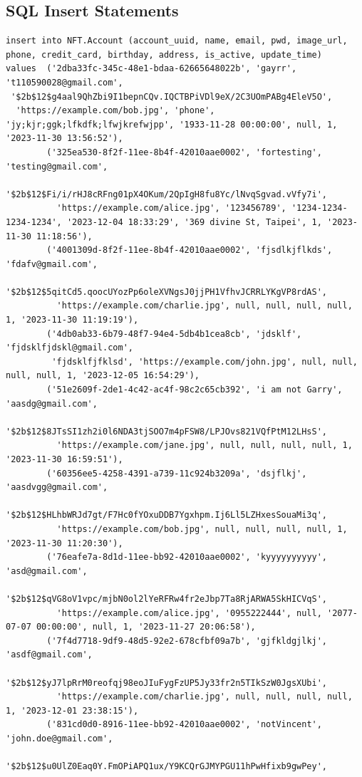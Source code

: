 \documentclass[a4paper, 12pt]{article}
\begin{document}
\subsection{SQL Insert Statements}
\tiny
\begin{verbatim}
insert into NFT.Account (account_uuid, name, email, pwd, image_url, phone, credit_card, birthday, address, is_active, update_time)
values  ('2dba33fc-345c-48e1-bdaa-62665648022b', 'gayrr', 't110590028@gmail.com',
 '$2b$12$g4aal9QhZbi9I1bepnCQv.IQCTBPiVDl9eX/2C3UOmPABg4EleV5O',
  'https://example.com/bob.jpg', 'phone', 'jy;kjr;ggk;lfkdfk;lfwjkrefwjpp', '1933-11-28 00:00:00', null, 1, '2023-11-30 13:56:52'),
        ('325ea530-8f2f-11ee-8b4f-42010aae0002', 'fortesting', 'testing@gmail.com',
         '$2b$12$Fi/i/rHJ8cRFng01pX4OKum/2QpIgH8fu8Yc/lNvqSgvad.vVfy7i',
          'https://example.com/alice.jpg', '123456789', '1234-1234-1234-1234', '2023-12-04 18:33:29', '369 divine St, Taipei', 1, '2023-11-30 11:18:56'),
        ('4001309d-8f2f-11ee-8b4f-42010aae0002', 'fjsdlkjflkds', 'fdafv@gmail.com',
         '$2b$12$5qitCd5.qoocUYozPp6oleXVNgsJ0jjPH1VfhvJCRRLYKgVP8rdAS',
          'https://example.com/charlie.jpg', null, null, null, null, 1, '2023-11-30 11:19:19'),
        ('4db0ab33-6b79-48f7-94e4-5db4b1cea8cb', 'jdsklf', 'fjdsklfjdskl@gmail.com',
         'fjdsklfjfklsd', 'https://example.com/john.jpg', null, null, null, null, 1, '2023-12-05 16:54:29'),
        ('51e2609f-2de1-4c42-ac4f-98c2c65cb392', 'i am not Garry', 'aasdg@gmail.com',
         '$2b$12$8JTsSI1zh2i0l6NDA3tjSOO7m4pFSW8/LPJOvs821VQfPtM12LHsS',
          'https://example.com/jane.jpg', null, null, null, null, 1, '2023-11-30 16:59:51'),
        ('60356ee5-4258-4391-a739-11c924b3209a', 'dsjflkj', 'aasdvgg@gmail.com',
         '$2b$12$HLhbWRJd7gt/F7Hc0fYOxuDDB7Ygxhpm.Ij6Ll5LZHxesSouaMi3q',
          'https://example.com/bob.jpg', null, null, null, null, 1, '2023-11-30 11:20:30'),
        ('76eafe7a-8d1d-11ee-bb92-42010aae0002', 'kyyyyyyyyyy', 'asd@gmail.com',
         '$2b$12$qVG8oV1vpc/mjbN0ol2lYeRFRw4fr2eJbp7Ta8RjARWA5SkHICVqS',
          'https://example.com/alice.jpg', '0955222444', null, '2077-07-07 00:00:00', null, 1, '2023-11-27 20:06:58'),
        ('7f4d7718-9df9-48d5-92e2-678cfbf09a7b', 'gjfkldgjlkj', 'asdf@gmail.com',
         '$2b$12$yJ7lpRrM0reofqj98eoJIuFygFzUP5Jy33fr2n5TIkSzW0JgsXUbi',
          'https://example.com/charlie.jpg', null, null, null, null, 1, '2023-12-01 23:38:15'),
        ('831cd0d0-8916-11ee-bb92-42010aae0002', 'notVincent', 'john.doe@gmail.com',
         '$2b$12$u0UlZ0Eaq0Y.FmOPiAPQ1ux/Y9KCQrGJMYPGU11hPwHfixb9gwPey',

\end{verbatim}
\end{document}
